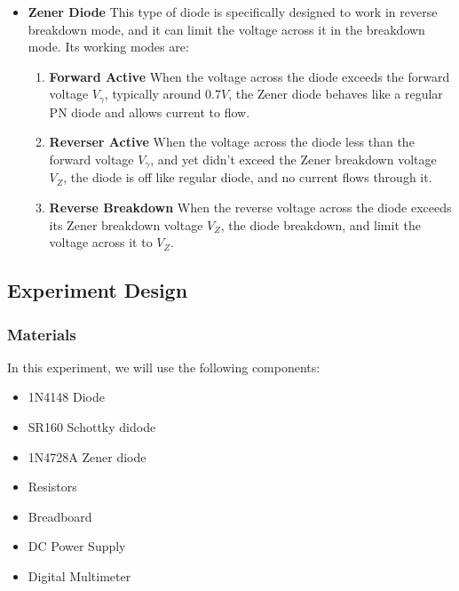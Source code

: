 \begin{itemize}
        \item \textbf{Zener Diode}
            This type of diode is specifically designed to work in reverse breakdown mode, and it can limit the voltage across it in the breakdown mode. Its working modes are:
            \begin{enumerate}
                \item \textbf{Forward Active}\newline
                    When the voltage across the diode exceeds the forward voltage $V_{\gamma}$, typically around $0.7V$, the Zener diode behaves like a regular PN diode and allows current to flow.

                \item \textbf{Reverser Active}\newline
                    When the voltage across the diode less than the forward voltage $V_{\gamma}$, and yet didn't exceed the Zener breakdown voltage $V_Z$, the diode is off like regular diode, and no current flows through it.

                \item \textbf{Reverse Breakdown}\newline
                    When the reverse voltage across the diode exceeds its Zener breakdown voltage $V_Z$, the diode breakdown, and limit the voltage across it to $V_Z$.
            \end{enumerate}
    \end{itemize}
\subsection{Experiment Design}
    \subsubsection{Materials}
        In this experiment, we will use the following components:
        \begin{itemize}
            \item 1N4148 Diode
            \item SR160 Schottky didode
            \item 1N4728A Zener diode
            \item Resistors
            \item Breadboard
            \item DC Power Supply
            \item Digital Multimeter
        \end{itemize}

